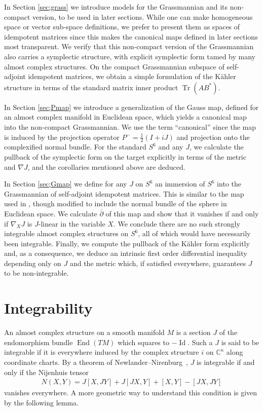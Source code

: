 \documentclass[10pt,a4paper]{amsart}
\DeclareMathOperator{\Tr}{Tr}
\numberwithin{equation}{section}
\newcommand{\CC}{\mathbb{C}}
\begin{document}
In Section \ref{sec;grass} we introduce models for the Grassmannian and its non-compact version, to be used in later sections. While one can make homogeneous space or vector sub-space definitions, we prefer to present them as spaces of idempotent matrices since this makes the canonical maps defined in later sections most transparent. We verify that this non-compact version of the Grassmannian also carries a symplectic structure, with explicit symplectic form tamed by many almost complex structures. On the compact Grassmannian subspace of self-adjoint idempotent matrices, we obtain a simple formulation of the K\"ahler structure in terms of the standard matrix inner product $\Tr (AB^*)$.

In Section \ref{sec;Pmap} we introduce a generalization of the Gauss map, defined for an almost complex manifold in Euclidean space, which yields a canonical map into the non-compact Grassmannian. We use the term ``canonical'' since the map is induced by the projection operator $P^- = \frac 1 2 (I + i J)$ and projection onto the complexified normal bundle. For the standard $S^6$ and any $J$, we calculate the pullback of the symplectic form on the target explicitly in terms of the metric and $\nabla J$, and the corollaries mentioned above are deduced.

In Section \ref{sec;Gmap} we define for any $J$ on $S^6$ an immersion of $S^6$ into the Grassmannian of self-adjoint idempotent matrices. This is similar to the map used in \cite{L}, though modified to include the normal bundle of the sphere in Euclidean space. We calculate $\overline{\partial}$ of this map and show that it vanishes if and only if $\nabla_X J$ is $J$-linear in the variable $X$. We conclude there are no such strongly integrable almost complex structures on $S^6$, all of which would have necessarily been integrable.
Finally, we compute the pullback of the K\"ahler form explicitly and, as a consequence, we deduce an intrinsic first order differential inequality depending only on $J$ and the metric which, if satisfied everywhere, guarantees $J$ to be non-integrable.

\section{Integrability} \label{sec;int}

An almost complex structure on a smooth manifold $M$ is a section $J$ of the endomorphism bundle $\operatorname{End}(TM)$ which squares to $-\operatorname{Id}$. Such a $J$ is said to be integrable if it is everywhere induced by the complex structure $i$ on $\CC^n$ along coordinate charts. By a theorem of Newlander--Nirenburg~\cite{NN}, $J$ is integrable if and only if the Nijenhuis tensor
\begin{gather} \label{eq:N}
N(X,Y) = J[X,JY] + J[JX,Y] + [X,Y] - [JX,JY]
\end{gather}
vanishes everywhere. A more geometric way to understand this condition is given by the following lemma.
\end{document}
